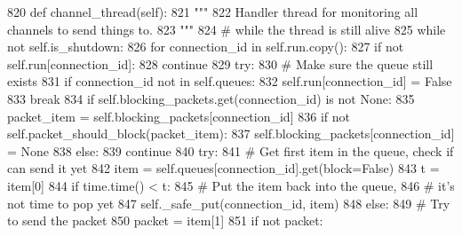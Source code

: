 \begin{DoxyCode}
820     \textcolor{keyword}{def }channel\_thread(self):
821         \textcolor{stringliteral}{"""}
822 \textcolor{stringliteral}{        Handler thread for monitoring all channels to send things to.}
823 \textcolor{stringliteral}{        """}
824         \textcolor{comment}{# while the thread is still alive}
825         \textcolor{keywordflow}{while} \textcolor{keywordflow}{not} self.is\_shutdown:
826             \textcolor{keywordflow}{for} connection\_id \textcolor{keywordflow}{in} self.run.copy():
827                 \textcolor{keywordflow}{if} \textcolor{keywordflow}{not} self.run[connection\_id]:
828                     \textcolor{keywordflow}{continue}
829                 \textcolor{keywordflow}{try}:
830                     \textcolor{comment}{# Make sure the queue still exists}
831                     \textcolor{keywordflow}{if} connection\_id \textcolor{keywordflow}{not} \textcolor{keywordflow}{in} self.queues:
832                         self.run[connection\_id] = \textcolor{keyword}{False}
833                         \textcolor{keywordflow}{break}
834                     \textcolor{keywordflow}{if} self.blocking\_packets.get(connection\_id) \textcolor{keywordflow}{is} \textcolor{keywordflow}{not} \textcolor{keywordtype}{None}:
835                         packet\_item = self.blocking\_packets[connection\_id]
836                         \textcolor{keywordflow}{if} \textcolor{keywordflow}{not} self.packet\_should\_block(packet\_item):
837                             self.blocking\_packets[connection\_id] = \textcolor{keywordtype}{None}
838                         \textcolor{keywordflow}{else}:
839                             \textcolor{keywordflow}{continue}
840                     \textcolor{keywordflow}{try}:
841                         \textcolor{comment}{# Get first item in the queue, check if can send it yet}
842                         item = self.queues[connection\_id].get(block=\textcolor{keyword}{False})
843                         t = item[0]
844                         \textcolor{keywordflow}{if} time.time() < t:
845                             \textcolor{comment}{# Put the item back into the queue,}
846                             \textcolor{comment}{# it's not time to pop yet}
847                             self.\_safe\_put(connection\_id, item)
848                         \textcolor{keywordflow}{else}:
849                             \textcolor{comment}{# Try to send the packet}
850                             packet = item[1]
851                             \textcolor{keywordflow}{if} \textcolor{keywordflow}{not} packet:

\end{DoxyCode}
